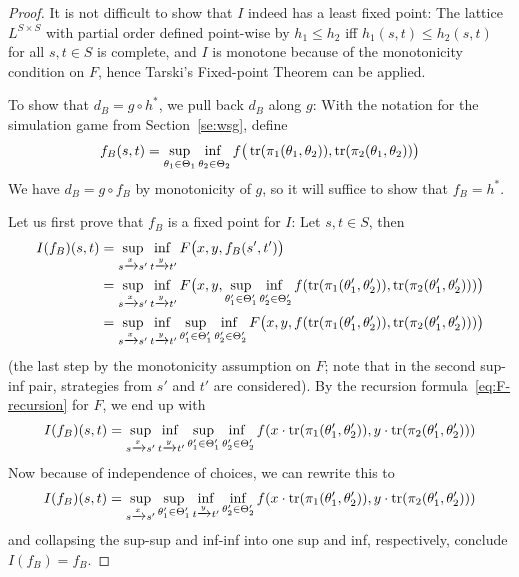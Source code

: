 \documentclass[copyright,creativecommons,sharealike]{eptcs}
\theoremstyle{plain}
\newcommand*\Strat{\Theta}
\newcommand*\tto[1]{\xrightarrow{#1}}
\begin{document}
\begin{proof}
  It is not difficult to show that $I$ indeed has a least fixed point:
  The lattice $L^{ S\times S}$ with partial order defined point-wise
  by $h_1\le h_2$ iff $h_1( s, t)\le h_2( s, t)$ for all $s, t\in S$
  is complete, and $I$ is monotone because of the monotonicity
  condition on $F$, hence Tarski's Fixed-point Theorem can be applied.

  To show that $d_B= g\circ h^*$, we pull back $d_B$ along $g$: With
  the notation for the simulation game from Section~\ref{se:wsg},
  define
  \begin{equation*}
    f_B( s, t)= \adjustlimits \sup_{ \theta_1\in \Strat_1} \inf_{
      \theta_2\in \Strat_2} f\big( \tr( \pi_1( \theta_1, \theta_2)),
    \tr( \pi_2( \theta_1, \theta_2))\big)
  \end{equation*}
  We have $d_B= g\circ f_B$ by monotonicity of $g$, so it will suffice
  to show that $f_B= h^*$.

  Let us first prove that $f_B$ is a fixed point for $I$: Let $s, t\in
  S$, then
  \begin{align*}
    I( f_B)( s, t) &=\adjustlimits \sup_{ s\tto x s'} \inf_{ t\tto y t'} F\big( x, y,
    f_B( s', t')\big)\\ &=\adjustlimits \sup_{ s\tto x s'} \inf_{ t\tto y t'} F\big( x, y,
    \adjustlimits \sup_{ \theta_1'\in \Strat_1'} \inf_{ \theta_2'\in
      \Strat_2'} f( \tr( \pi_1( \theta_1', \theta_2')), \tr( \pi_2(
    \theta_1', \theta_2')))\big)\\ &=\adjustlimits \sup_{ s\tto x s'} \inf_{ t\tto y t'} \adjustlimits
    \sup_{ \theta_1'\in \Strat_1'} \inf_{ \theta_2'\in \Strat_2'} F\big(
    x, y, f( \tr( \pi_1( \theta_1', \theta_2')), \tr( \pi_2(
    \theta_1', \theta_2')))\big)
  \end{align*}
  (the last step by the monotonicity assumption on $F$; note that in
  the second sup-inf pair, strategies from $s'$ and $t'$ are
  considered).  By the recursion formula~\eqref{eq:F-recursion} for
  $F$, we end up with
  \begin{equation*}
    I( f_B)( s, t) =\adjustlimits \sup_{ s\tto x s'} \inf_{ t\tto y t'} \adjustlimits
    \sup_{ \theta_1'\in \Strat_1'} \inf_{ \theta_2'\in \Strat_2'} f(
    x\cdot \tr( \pi_1( \theta_1', \theta_2')), y\cdot \tr(
    \pi_2( \theta_1', \theta_2')))
  \end{equation*}
  Now because of independence of choices, we can rewrite this to
  \begin{equation*}
    I( f_B)( s, t) =\sup_{ s\tto x s'} \sup_{ \theta_1'\in \Strat_1'} \inf_{ t\tto y
      t'} \inf_{ \theta_2'\in \Strat_2'} f(
    x\cdot \tr( \pi_1( \theta_1', \theta_2')), y\cdot \tr(
    \pi_2( \theta_1', \theta_2')))
  \end{equation*}
  and collapsing the sup-sup and inf-inf into one sup and inf,
  respectively, conclude $I( f_B)= f_B$.


\end{proof}
\end{document}
